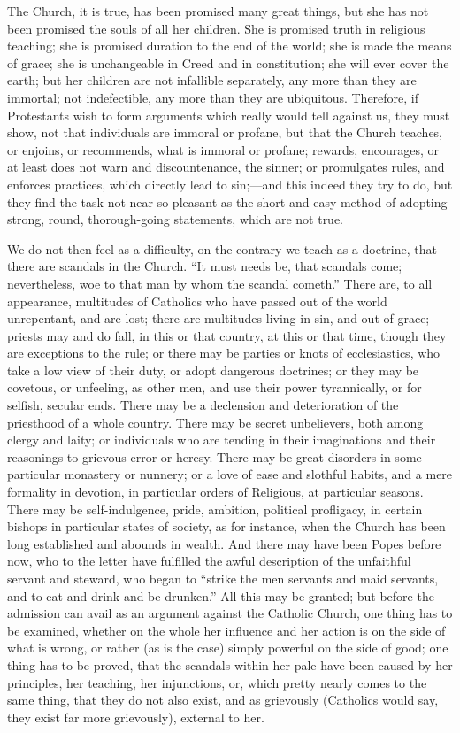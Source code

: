 The Church, it is true, has been promised many great
things, but she has not been promised the souls of all
her children. She is promised truth in religious
teaching; she is promised duration to the end of the
world; she is made the means of grace; she is
unchangeable in Creed and in constitution; she will ever
cover the earth; but her children are not infallible
separately, any more than they are immortal; not
indefectible, any more than they are ubiquitous.
Therefore, if Protestants wish to form arguments which
really would tell against us, they must show, not that
individuals are immoral or profane, but that the Church
teaches, or enjoins, or recommends, what is immoral or
profane; rewards, encourages, or at least does not warn
and discountenance, the sinner; or promulgates rules, and
enforces practices, which directly lead to sin;—and
this indeed they try to do, but they find the task not
near so pleasant as the short and easy method of adopting
strong, round, thorough-going statements, which are not
true.

We do not then feel as a difficulty, on the contrary
we teach as a doctrine, that there are scandals in the
Church. ``It must needs be, that scandals come;
nevertheless, woe to that man by whom the scandal
cometh.'' There are, to all appearance, multitudes of
Catholics who have passed out of the world unrepentant, and are lost; there are multitudes living in sin, and out
of grace; priests may and do fall, in this or that
country, at this or that time, though they are exceptions
to the rule; or there may be parties or knots of
ecclesiastics, who take a low view of their duty, or
adopt dangerous doctrines; or they may be covetous, or
unfeeling, as other men, and use their power
tyrannically, or for selfish, secular ends. There may be
a declension and deterioration of the priesthood of a
whole country. There may be secret unbelievers, both
among clergy and laity; or individuals who are tending in
their imaginations and their reasonings to grievous error
or heresy. There may be great disorders in some
particular monastery or nunnery; or a love of ease and
slothful habits, and a mere formality in devotion, in
particular orders of Religious, at particular seasons.
There may be self-indulgence, pride, ambition, political
profligacy, in certain bishops in particular states of
society, as for instance, when the Church has been long
established and abounds in wealth. And there may have
been Popes before now, who to the letter have fulfilled
the awful description of the unfaithful servant and
steward, who began to ``strike the men servants and
maid servants, and to eat and drink and be drunken.''
All this may be granted; but before the admission can
avail as an argument against the Catholic Church, one
thing has to be examined, whether on the whole her
influence and her action is on the side of what is wrong,
or rather (as is the case) simply powerful on the side of
good; one thing has to be proved, that the scandals
within her pale have been caused by her principles, her
teaching, her injunctions, or, which pretty nearly comes
to the same thing, that they do not also exist, and as
grievously (Catholics would say, they exist far more
grievously), external to her.

